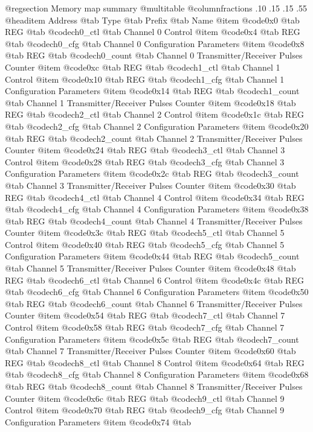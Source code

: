 @regsection Memory map summary
@multitable  @columnfractions .10 .15 .15 .55
@headitem Address @tab Type @tab Prefix @tab Name
@item @code{0x0} @tab
REG @tab
@code{ch0_ctl} @tab
Channel 0 Control
@item @code{0x4} @tab
REG @tab
@code{ch0_cfg} @tab
Channel 0 Configuration Parameters
@item @code{0x8} @tab
REG @tab
@code{ch0_count} @tab
Channel 0 Transmitter/Receiver Pulses Counter
@item @code{0xc} @tab
REG @tab
@code{ch1_ctl} @tab
Channel 1 Control
@item @code{0x10} @tab
REG @tab
@code{ch1_cfg} @tab
Channel 1 Configuration Parameters
@item @code{0x14} @tab
REG @tab
@code{ch1_count} @tab
Channel 1 Transmitter/Receiver Pulses Counter
@item @code{0x18} @tab
REG @tab
@code{ch2_ctl} @tab
Channel 2 Control
@item @code{0x1c} @tab
REG @tab
@code{ch2_cfg} @tab
Channel 2 Configuration Parameters
@item @code{0x20} @tab
REG @tab
@code{ch2_count} @tab
Channel 2 Transmitter/Receiver Pulses Counter
@item @code{0x24} @tab
REG @tab
@code{ch3_ctl} @tab
Channel 3 Control
@item @code{0x28} @tab
REG @tab
@code{ch3_cfg} @tab
Channel 3 Configuration Parameters
@item @code{0x2c} @tab
REG @tab
@code{ch3_count} @tab
Channel 3 Transmitter/Receiver Pulses Counter
@item @code{0x30} @tab
REG @tab
@code{ch4_ctl} @tab
Channel 4 Control
@item @code{0x34} @tab
REG @tab
@code{ch4_cfg} @tab
Channel 4 Configuration Parameters
@item @code{0x38} @tab
REG @tab
@code{ch4_count} @tab
Channel 4 Transmitter/Receiver Pulses Counter
@item @code{0x3c} @tab
REG @tab
@code{ch5_ctl} @tab
Channel 5 Control
@item @code{0x40} @tab
REG @tab
@code{ch5_cfg} @tab
Channel 5 Configuration Parameters
@item @code{0x44} @tab
REG @tab
@code{ch5_count} @tab
Channel 5 Transmitter/Receiver Pulses Counter
@item @code{0x48} @tab
REG @tab
@code{ch6_ctl} @tab
Channel 6 Control
@item @code{0x4c} @tab
REG @tab
@code{ch6_cfg} @tab
Channel 6 Configuration Parameters
@item @code{0x50} @tab
REG @tab
@code{ch6_count} @tab
Channel 6 Transmitter/Receiver Pulses Counter
@item @code{0x54} @tab
REG @tab
@code{ch7_ctl} @tab
Channel 7 Control
@item @code{0x58} @tab
REG @tab
@code{ch7_cfg} @tab
Channel 7 Configuration Parameters
@item @code{0x5c} @tab
REG @tab
@code{ch7_count} @tab
Channel 7 Transmitter/Receiver Pulses Counter
@item @code{0x60} @tab
REG @tab
@code{ch8_ctl} @tab
Channel 8 Control
@item @code{0x64} @tab
REG @tab
@code{ch8_cfg} @tab
Channel 8 Configuration Parameters
@item @code{0x68} @tab
REG @tab
@code{ch8_count} @tab
Channel 8 Transmitter/Receiver Pulses Counter
@item @code{0x6c} @tab
REG @tab
@code{ch9_ctl} @tab
Channel 9 Control
@item @code{0x70} @tab
REG @tab
@code{ch9_cfg} @tab
Channel 9 Configuration Parameters
@item @code{0x74} @tab
